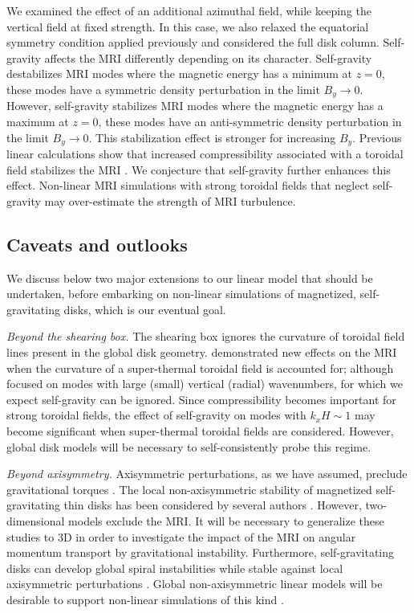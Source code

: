 
We examined the effect of an additional azimuthal field, while
keeping the vertical field at fixed strength. In this case, we also
relaxed the equatorial symmetry condition applied previously and
considered the full disk column. Self-gravity affects the MRI
differently depending on its character. 
Self-gravity destabilizes MRI modes where the magnetic
energy has a minimum at $z=0$, these modes have a symmetric
density perturbation in the limit $B_y\to0$. However, 
self-gravity stabilizes MRI modes where the magnetic energy has a
maximum at $z=0$, these modes have an anti-symmetric density
perturbation in the limit $B_y\to0$. This stabilization effect is
stronger for increasing $B_y$. Previous linear calculations show that 
increased compressibility associated with a toroidal field stabilizes
the MRI \citep{kim03}. We conjecture that self-gravity 
further enhances this effect. Non-linear MRI simulations with strong
toroidal fields that neglect self-gravity may over-estimate the
strength of MRI turbulence.   



\subsection{Caveats and outlooks}
We discuss below two major extensions to our linear model that
should be undertaken, before embarking on non-linear simulations of
magnetized, self-gravitating disks, which is our eventual goal.  

\emph{Beyond the shearing box.} The shearing box ignores the curvature
of toroidal field lines present in the global disk 
geometry. \cite{pessah05} demonstrated new effects on the MRI 
when the curvature of a super-thermal toroidal field is accounted for;
although \citeauthor{pessah05} focused on modes with large (small)
vertical (radial) wavenumbers, for which we expect self-gravity
can be ignored. 
Since compressibility becomes important for strong
toroidal fields, the effect of self-gravity on modes with $k_xH\sim1$
may become significant when super-thermal toroidal fields are
considered. However, global disk models will be necessary
to self-consistently probe this regime. 


\emph{Beyond axisymmetry.} Axisymmetric perturbations, as we have
assumed, preclude gravitational torques \citep{lynden-bell72}. 
The local non-axisymmetric stability of magnetized self-gravitating
thin disks has been considered by several authors
\citep{elmegreen87,gammie96b,fan97,kim01}. However, two-dimensional models
exclude the MRI. It will be necessary to generalize these studies to
3D in order to investigate the impact of the MRI on angular momentum
transport by gravitational instability. Furthermore, self-gravitating
disks can develop global spiral instabilities while stable against local 
axisymmetric perturbations \citep{papaloizou89,papaloizou91}. Global
non-axisymmetric linear models will be desirable to support non-linear
simulations of this kind \citep{fromang04c,fromang05}.    

